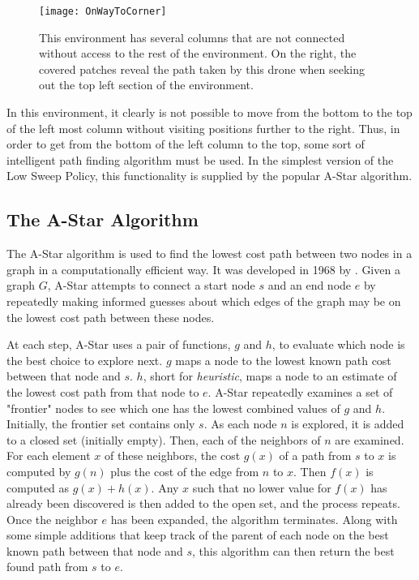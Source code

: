 \begin{figure}[H]
\texttt{[image: OnWayToCorner]}
\caption[Environment with non-continuous columns]{This environment has several columns that are not connected without access to the rest of the environment. On the right, the covered patches reveal the path taken by this drone when seeking out the top left section of the environment.}
\end{figure}

In this environment, it clearly is not possible to move from the bottom to the top of the left most column without visiting positions further to the right. Thus, in order to get from the bottom of the left column to the top, some sort of intelligent path finding algorithm must be used. In the simplest version of the Low Sweep Policy, this functionality is supplied by the popular A-Star algorithm.

\subsection{The A-Star Algorithm}

The A-Star algorithm is used to find the lowest cost path between two nodes in a graph in a computationally efficient way. It was developed in 1968 by \citeauthor{A-Star} \cite{A-Star}. Given a graph $ G $, A-Star attempts to connect a start node $s$ and an end node $e$ by repeatedly making informed guesses about which edges of the graph may be on the lowest cost path between these nodes.

At each step, A-Star uses a pair of functions, $g$ and $h$, to evaluate which node is the best choice to explore next. $g$ maps a node to the lowest known path cost between that node and $s$. $h$, short for \textit{heuristic}, maps a node to an estimate of the lowest cost path from that node to $e$. A-Star repeatedly examines a set of "frontier" nodes to see which one has the lowest combined values of $g$ and $h$. Initially, the frontier set contains only $s$. As each node $n$ is explored, it is added to a closed set (initially empty). Then, each of the neighbors of $n$ are examined. For each element $x$ of these neighbors, the cost $g(x)$ of a path from $s$ to $x$ is computed by $g(n)$ plus the cost of the edge from $n$ to $x$. Then $f(x)$ is computed as $g(x) + h(x)$. Any $x$ such that no lower value for $f(x)$ has already been discovered is then added to the open set, and the process repeats. Once the neighbor $e$ has been expanded, the algorithm terminates. Along with some simple additions that keep track of the parent of each node on the best known path between that node and $s$, this algorithm can then return the best found path from $s$ to $e$. 

